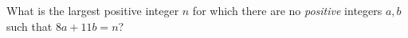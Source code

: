 What is the largest positive integer $n$ for which there are no \emph{positive} integers $a,b$ such that $8a+11b=n$?